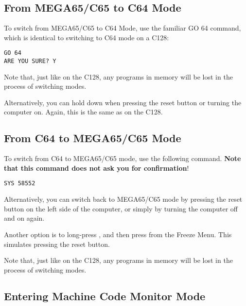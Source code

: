 \subsection{From MEGA65/C65 to C64 Mode}

To switch from MEGA65/C65 to C64 Mode, use the familiar GO 64 command, which is identical to switching to C64
mode on a C128:

\begin{tcolorbox}[colback=black,coltext=white]
\verbatimfont{\codefont}
\begin{verbatim}
GO 64
ARE YOU SURE? Y
\end{verbatim}
\end{tcolorbox}

Note that, just like on the C128, any programs in memory will be lost in the process of switching modes.

Alternatively, you can hold \megasymbolkey down when pressing the reset button or turning the computer on. Again,
this is the same as on the C128.

\subsection{From C64 to MEGA65/C65 Mode}

To switch from C64 to MEGA65/C65 mode, use the following command. {\bf Note that this command does not ask you for
confirmation}!

\begin{tcolorbox}[colback=black,coltext=white]
\verbatimfont{\codefont}
\begin{verbatim}
SYS 58552
\end{verbatim}
\end{tcolorbox}

Alternatively, you can switch back to MEGA65/C65 mode by pressing the reset
button on the left side of the computer, or simply by turning the
computer off and on again.

Another option is to long-press , and then press 
from the Freeze Menu.  This simulates pressing the reset button.

Note that, just like on the C128, any programs in memory will be
lost in the process of switching modes.

\subsection{Entering Machine Code Monitor Mode}


